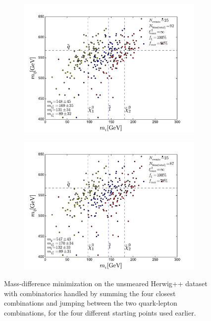 \documentclass[twoside,english]{uiofysmaster}
\begin{document}
\begin{figure}[hbt!]
	\begin{subfigure}[b]{0.45\textwidth}
		\includegraphics[width=\textwidth]{figures/improving_combinatorics/herwigpp-4combosum-fit-jump_comb-nosmear-nocut-800-500-300-50.pdf} 
		\caption{ }
	\end{subfigure}
	\begin{subfigure}[b]{0.45\textwidth}
		\includegraphics[width=\textwidth]{figures/improving_combinatorics/herwigpp-4combosum-fit-jump_comb-nosmear-nocut-1000-100-80-30.pdf}
		\caption{ } 
	\end{subfigure}
	\caption{Mass-difference minimization on the unsmeared Herwig++ dataset with combinatorics handled by summing the four closest combinations and jumping between the two quark-lepton combinations, for the four different starting points used earlier.}
	\label{fig:4combosum_starting_point_sensitivity_combinatorics-jumping}
\end{figure}
\end{document}
